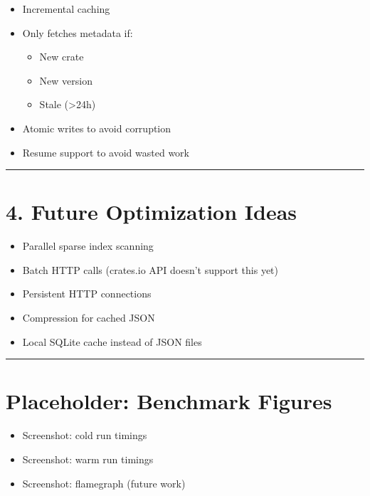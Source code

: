 \documentclass[
  letterpaper,
  DIV=11,
  numbers=noendperiod]{scrreprt}
\providecommand{\tightlist}{%
  \setlength{\itemsep}{0pt}\setlength{\parskip}{0pt}}
\begin{document}
\begin{itemize}
\tightlist
\item
  Incremental caching\\
\item
  Only fetches metadata if:

  \begin{itemize}
  \tightlist
  \item
    New crate
  \item
    New version
  \item
    Stale (\textgreater24h)
  \end{itemize}
\item
  Atomic writes to avoid corruption\\
\item
  Resume support to avoid wasted work
\end{itemize}

\begin{center}\rule{0.5\linewidth}{0.5pt}\end{center}

\section{4. Future Optimization Ideas}\label{future-optimization-ideas}

\begin{itemize}
\tightlist
\item
  Parallel sparse index scanning\\
\item
  Batch HTTP calls (crates.io API doesn't support this yet)\\
\item
  Persistent HTTP connections\\
\item
  Compression for cached JSON\\
\item
  Local SQLite cache instead of JSON files
\end{itemize}

\begin{center}\rule{0.5\linewidth}{0.5pt}\end{center}

\section{Placeholder: Benchmark
Figures}\label{placeholder-benchmark-figures}

\begin{itemize}
\tightlist
\item[$\square$]
  Screenshot: cold run timings\\
\item[$\square$]
  Screenshot: warm run timings\\
\item[$\square$]
  Screenshot: flamegraph (future work)
\end{itemize}
\end{document}
